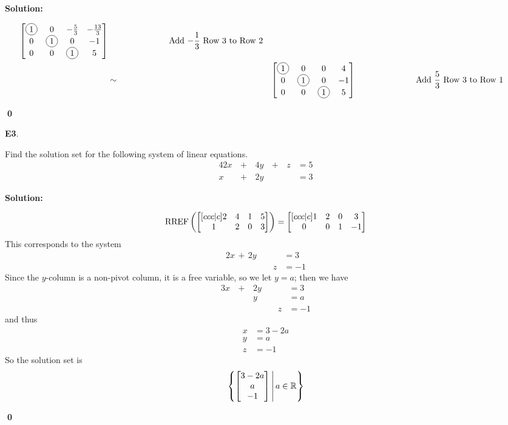\documentclass{article}
\newenvironment{problem}[1]
{
  \begin{flushleft}
  \textbf{#1}.
  \ignorespaces
}
{
  \end{flushleft}
}
\newenvironment{solution}
{
  \ignorespaces
  \textbf{Solution:}
}
{
  \ignorespacesafterend
  \begin{flushright}
  {\bfseries \qed}
  \end{flushright}
}
\begin{document}
\begin{solution}
\begin{alignat*}{4}
\begin{bmatrix}
  \circledNumber{1} & 0 & -\frac{5}{3} & -\frac{13}{3} \\
  0 & \circledNumber{1} & 0 & -1 \\
  0 & 0 & \circledNumber{1} & 5
  \end{bmatrix}
  &\hspace{1in} \text{Add \(-\frac{1}{3}\) Row 3 to Row 2}& \\
  &\sim&
  \begin{bmatrix}
  \circledNumber{1} & 0 & 0 & 4 \\
  0 & \circledNumber{1} & 0 & -1 \\
  0 & 0 & \circledNumber{1} & 5
  \end{bmatrix}
  &\hspace{1in} \text{Add \(\frac{5}{3}\) Row 3 to Row 1}& \\
\end{alignat*}
\end{solution}

\begin{problem}{E3}
Find the solution set for the following system of linear equations.
\begin{alignat*}{4}
2x&\,+\,&4y&\,+\,&z &= 5 \\
x&\,+\,&2y &\,\,& &= 3
\end{alignat*}
\end{problem}
\begin{solution}
\[
  \operatorname{RREF} \left(
    \begin{bmatrix}[ccc|c] 2 & 4 & 1 & 5 \\ 1 & 2 & 0 & 3 \end{bmatrix}
  \right)
    =
  \begin{bmatrix}[ccc|c] 1 & 2 & 0 & 3 \\ 0 & 0 & 1 & -1\end{bmatrix}
\]
This corresponds to the system
\begin{alignat*}{2}
x\,+\,2y&\,\,&  &= 3 \\
  &\,\,& z&= -1
\end{alignat*}
Since the $y$-column is a non-pivot column, it is a free variable, so we let $y=a$; then we have
\begin{alignat*}{3}
x&\,+\,&2y&\,\,&  &= 3 \\
 &\,\,&y &\,\,& &=a \\
 &\,\,& &\,\,& z&= -1
\end{alignat*}
and thus
\begin{align*}
x&= 3-2a \\
y&= a \\
z&= -1
\end{align*}
So the solution set is
\[
  \left\{
    \begin{bmatrix} 3-2a \\ a \\ -1 \end{bmatrix}
  \,\middle|\,
    a \in \mathbb{R}
  \right\}
\]
\end{solution}
\end{document}
